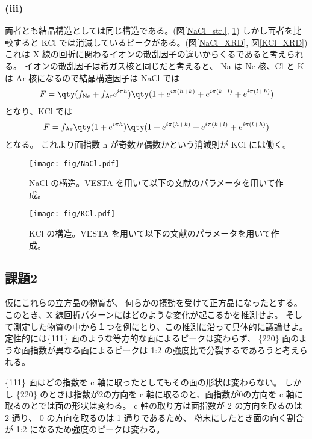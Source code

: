 \documentclass[11pt,dvipdfmx,a4paper]{jsarticle}
\begin{document}
\subsubsection*{(iii)}
両者とも結晶構造としては同じ構造である。(図\ref{NaCl_str.}, \ref{KCl_str.})
しかし両者を比較すると KCl では消滅しているピークがある。(図\ref{NaCl_XRD}, 図\ref{KCl_XRD})
これは X 線の回折に関わるイオンの散乱因子の違いからくるであると考えられる。
イオンの散乱因子は希ガス核と同じだと考えると、
Na は Ne 核、Cl と K は Ar 核になるので結晶構造因子は
NaCl では
\begin{align}
	F = \qty(f_{\text{Ne}}+f_{\text{Ar}}e^{i\pi h})\qty(1+e^{i\pi(h+k)}+e^{i\pi(k+l)}+e^{i\pi(l+h)})
\end{align}
となり、KCl では
\begin{align}
	F = f_{\text{Ar}}\qty(1 + e^{i\pi h})\qty(1+e^{i\pi(h+k)}+e^{i\pi(k+l)}+e^{i\pi(l+h)})
\end{align}
となる。
これより面指数 h が奇数か偶数かという消滅則が KCl には働く。
\begin{figure}[H]
	\centering
	\begin{minipage}[t]{0.48\columnwidth}
		\centering
		\texttt{[image: fig/NaCl.pdf]}
		\caption{NaCl の構造。VESTA を用いて以下の文献のパラメータを用いて作成。\cite{cfi_NaCl}}
		\label{NaCl_str.}
	\end{minipage}
	\hfill
	\begin{minipage}[t]{0.48\columnwidth}
		\centering
		\texttt{[image: fig/KCl.pdf]}
		\caption{KCl の構造。VESTA を用いて以下の文献のパラメータを用いて作成。\cite{cfi_NaCl}}
		\label{KCl_str.}
	\end{minipage}
\end{figure}

\subsection*{課題2} 仮にこれらの立方晶の物質が、
何らかの摂動を受けて正方晶になったとする。
このとき、X 線回折パターンにはどのような変化が起こるかを推測せよ。
そして測定した物質の中から１つを例にとり、この推測に沿って具体的に議論せよ。\\

定性的には\{111\} 面のような等方的な面によるピークは変わらず、
\{220\} 面のような面指数が異なる面によるピークは 1:2 の強度比で分裂するであろうと考えられる。

\{111\} 面はどの指数を c 軸に取ったとしてもその面の形状は変わらない。%
しかし \{220\} のときは指数が2の方向を c 軸に取るのと、面指数が0の方向を c 軸に取るのとでは面の形状は変わる。
c 軸の取り方は面指数が 2 の方向を取るのは 2 通り、 0 の方向を取るのは 1 通りであるため、
粉末にしたとき面の向く割合が 1:2 になるため強度のピークは変わる。
\end{document}
